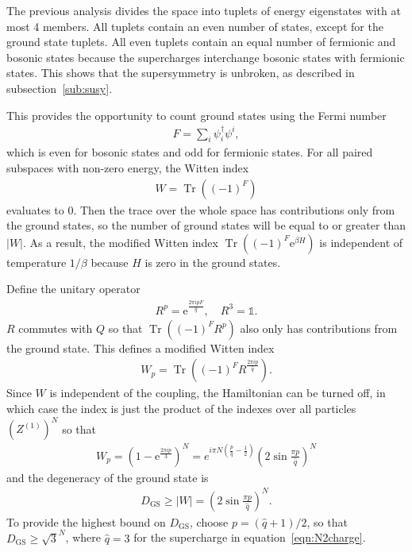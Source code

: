 \documentclass[12pt]{article} %
\newcommand{\abs}[1]{\left|#1\right|}
\renewcommand{\th}[1]{\frac{1}{#1}}
\newcommand{\e}{\text{e}}
\DeclareMathOperator{\Tr}{Tr}
\begin{document}
The previous analysis divides the space into tuplets of energy eigenstates with at most 4 members. All tuplets contain an even number of states, except for the ground state tuplets. All even tuplets contain an equal number of fermionic and bosonic states because the supercharges interchange bosonic states with fermionic states. This shows that the supersymmetry is unbroken, as described in subsection~\ref{sub:susy}.

This provides the opportunity to count ground states using the Fermi number
\begin{align}
F = \sum_i\psi^\dag_i\psi^i,
\end{align}
which is even for bosonic states and odd for fermionic states. For all paired subspaces with non-zero energy, the Witten index 
\begin{align}
W = \Tr\left((-1)^F\right) 
	\label{eqn:N2witten}
\end{align}
evaluates to 0. Then the trace over the whole space has contributions only from the ground states, so the number of ground states will be equal to or greater than $|W|$. As a result, the modified Witten index $\Tr\left((-1)^F\e^{\beta H}\right)$ is independent of temperature $1/\beta$ because $H$ is zero in the ground states. 

Define the unitary operator 
\begin{align}
R^p = \e^{\frac{2\pi ipF}{\hat q}},\quad R^3 = \mathbb{1}.
\end{align}
$R$ commutes with $Q$ so that $\Tr\left((-1)^FR^p\right)$ also only has contributions from the ground state. This defines a modified Witten index
\begin{align}
W_p = \Tr\left((-1)^FR^\frac{2\pi ip}{\hat q}\right).
\end{align}
Since $W$ is independent of the coupling, the Hamiltonian can be turned off, in which case the index is just the product of the indexes over all particles $\left(Z^{(1)}\right)^N$ so that 
\begin{align}
W_p = \left(1-\e^{\frac{2\pi ip}{3}}\right)^N = e^{i\pi N\left(\frac{p}{\hat q} - \th{2}\right)}\left(2\sin\frac{\pi p}{\hat q}\right)^N
\end{align}
and the degeneracy of the ground state is 
\begin{align}
D_\text{GS} \ge \abs{W} = \left(2\sin\frac{\pi p}{\hat q}\right)^N. \label{eqn:dgs}
\end{align}
To provide the highest bound on $D_\text{GS}$, choose $p = (\hat q+1)/2$, so that $D_\text{GS} \ge \sqrt{3}^N$, where $\hat q = 3$ for the supercharge in equation~\ref{eqn:N2charge}.
\end{document}
